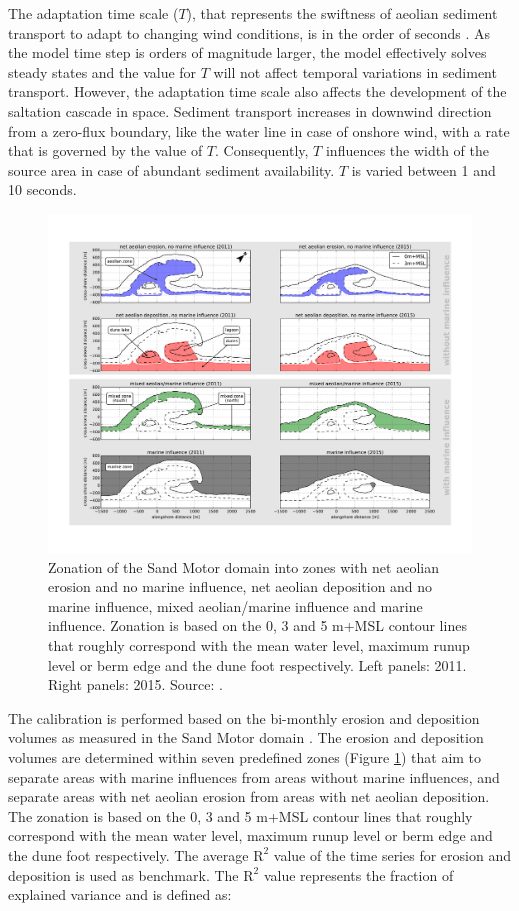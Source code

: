 The adaptation time scale ($T$), that represents the swiftness of
aeolian sediment transport to adapt to changing wind conditions, is in
the order of seconds \citep{DavidsonArnott2008, deVries2014a}. As the
model time step is orders of magnitude larger, the model effectively
solves steady states and the value for $T$ will not affect temporal
variations in sediment transport. However, the adaptation time scale
also affects the development of the saltation cascade in
space. Sediment transport increases in downwind direction from a
zero-flux boundary, like the water line in case of onshore wind, with
a rate that is governed by the value of $T$. Consequently, $T$
influences the width of the source area in case of abundant sediment
availability. $T$ is varied between 1 and 10 seconds.

\begin{figure}
  \centering
  \includegraphics[width=\columnwidth]{../Figures/decomposition}
  \caption{Zonation of the Sand Motor domain into zones with net
    aeolian erosion and no marine influence, net aeolian deposition
    and no marine influence, mixed aeolian/marine influence and marine
    influence. Zonation is based on the 0, 3 and 5 m+MSL contour lines
    that roughly correspond with the mean water level, maximum runup
    level or berm edge and the dune foot respectively. Left panels:
    2011. Right panels: 2015. Source: \citet{Hoonhout2017a}.}
  \label{fig:decomposition2}
\end{figure}

The calibration is performed based on the bi-monthly erosion and
deposition volumes as measured in the Sand Motor domain
\citep{Hoonhout2017a}. The erosion and deposition volumes are
determined within seven predefined zones (Figure
\ref{fig:decomposition2}) that aim to separate areas with marine
influences from areas without marine influences, and separate areas
with net aeolian erosion from areas with net aeolian deposition. The
zonation is based on the 0, 3 and 5 m+MSL contour lines that roughly
correspond with the mean water level, maximum runup level or berm edge
and the dune foot respectively. The average $\mathrm{R^2}$ value of
the time series for erosion and deposition is used as benchmark. The
$\mathrm{R^2}$ value represents the fraction of explained variance and
is defined as:

